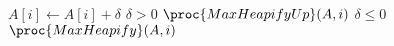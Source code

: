 \begin{codebox}
\li $A[i] \gets A[i] + \delta$
\li \If $\delta > 0$
\li     \Then
            $\proc{MaxHeapifyUp}(A,i)$
\li     \Else
        \Comment $\delta \leq 0$
\li         $\proc{MaxHeapify}(A,i)$
        \End
\end{codebox}